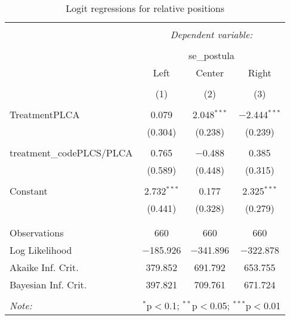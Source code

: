 \begin{table}[!htbp] \centering 
  \caption{Logit regressions for relative positions} 
  \label{} 
\begin{tabular}{@{\extracolsep{5pt}}lccc} 
\\[-1.8ex]\hline 
\hline \\[-1.8ex] 
 & \multicolumn{3}{c}{\textit{Dependent variable:}} \\ 
\cline{2-4} 
\\[-1.8ex] & \multicolumn{3}{c}{se\_postula} \\ 
 & Left & Center & Right \\ 
\\[-1.8ex] & (1) & (2) & (3)\\ 
\hline \\[-1.8ex] 
 TreatmentPLCA & 0.079 & 2.048$^{***}$ & $-$2.444$^{***}$ \\ 
  & (0.304) & (0.238) & (0.239) \\ 
  & & & \\ 
 treatment\_codePLCS/PLCA & 0.765 & $-$0.488 & 0.385 \\ 
  & (0.589) & (0.448) & (0.315) \\ 
  & & & \\ 
 Constant & 2.732$^{***}$ & 0.177 & 2.325$^{***}$ \\ 
  & (0.441) & (0.328) & (0.279) \\ 
  & & & \\ 
\hline \\[-1.8ex] 
Observations & 660 & 660 & 660 \\ 
Log Likelihood & $-$185.926 & $-$341.896 & $-$322.878 \\ 
Akaike Inf. Crit. & 379.852 & 691.792 & 653.755 \\ 
Bayesian Inf. Crit. & 397.821 & 709.761 & 671.724 \\ 
\hline 
\hline \\[-1.8ex] 
\textit{Note:}  & \multicolumn{3}{r}{$^{*}$p$<$0.1; $^{**}$p$<$0.05; $^{***}$p$<$0.01} \\ 
\end{tabular} 
\end{table} 